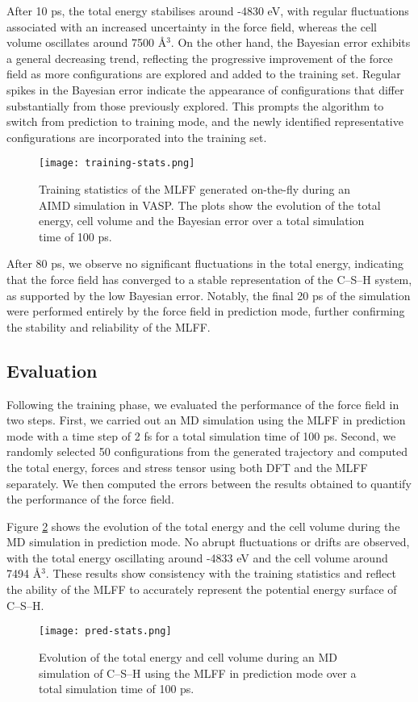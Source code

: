 After 10 ps, the total energy stabilises around -4830 eV, with regular fluctuations associated with an increased uncertainty in the force field, whereas the cell volume oscillates around 7500 \AA$^3$. On the other hand, the Bayesian error exhibits a general decreasing trend, reflecting the progressive improvement of the force field as more configurations are explored and added to the training set. Regular spikes in the Bayesian error indicate the appearance of configurations that differ substantially from those previously explored. This prompts the algorithm to switch from prediction to training mode, and the newly identified representative configurations are incorporated into the training set. 
\begin{figure}[H]
    \centering
    \texttt{[image: training-stats.png]}
    \caption{
    Training statistics of the MLFF generated on-the-fly during an AIMD simulation in VASP. The plots show the evolution of the total energy, cell volume and the Bayesian error over a total simulation time of 100 ps. 
    }
    \label{training-stats}
\end{figure}

After 80 ps, we observe no significant fluctuations in the total energy, indicating that the force field has converged to a stable representation of the C--S--H system, as supported by the low Bayesian error. Notably, the final 20 ps of the simulation were performed entirely by the force field in prediction mode, further confirming the stability and reliability of the MLFF.

\subsection{Evaluation}
Following the training phase, we evaluated the performance of the force field in two steps. First, we carried out an MD simulation using the MLFF in prediction mode with a time step of 2 fs for a total simulation time of 100 ps. Second, we randomly selected 50 configurations from the generated trajectory and computed the total energy, forces and stress tensor using both DFT and the MLFF separately. We then computed the errors between the results obtained to quantify the performance of the force field. 

Figure \ref{pred-stats} shows the evolution of the total energy and the cell volume during the MD simulation in prediction mode. No abrupt fluctuations or drifts are observed, with the total energy oscillating around -4833 eV and the cell volume around 7494 \AA$^3$. These results show consistency with the training statistics and reflect the ability of the MLFF to accurately represent the potential energy surface of C--S--H. 
\begin{figure}[h!]
    \centering
    \texttt{[image: pred-stats.png]}
    \caption{
    Evolution of the total energy and cell volume during an MD simulation of C--S--H using the MLFF in prediction mode over a total simulation time of 100 ps.  
    }
    \label{pred-stats}
\end{figure}

